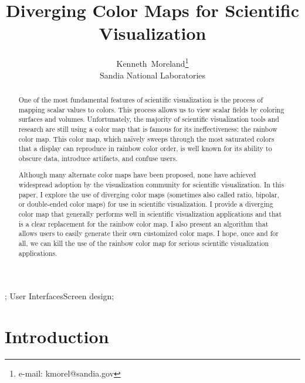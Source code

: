 \documentclass{acmsiggraph}               %
\title{Diverging Color Maps for Scientific Visualization}
\author{Kenneth~Moreland\thanks{e-mail: kmorel@sandia.gov}\\Sandia National Laboratories}
\begin{document}

\maketitle

\begin{abstract}
  One of the most fundamental features of scientific visualization is the
  process of mapping scalar values to colors.  This process allows us to
  view scalar fields by coloring surfaces and volumes.  Unfortunately, the
  majority of scientific visualization tools and research are still using a
  color map that is famous for its ineffectiveness: the rainbow color map.
  This color map, which na\"{i}vely sweeps through the most
  saturated colors that a display can reproduce in rainbow color order, is
  well known for its ability to obscure data, introduce artifacts, and
  confuse users.

  Although many alternate color maps have been proposed, none have achieved
  widespread adoption by the visualization community for scientific
  visualization.  In this paper, I explore the use of diverging color maps
  (sometimes also called ratio, bipolar, or double-ended color maps) for
  use in scientific visualization.  I provide a diverging color map that
  generally performs well in scientific visualization applications and that
  is a clear replacement for the rainbow color map.  I also present an
  algorithm that allows users to easily generate their own customized color
  maps.  I hope, once and for all, we can kill the use of the rainbow
  color map for serious scientific visualization applications.
\end{abstract}


\begin{CRcatlist}
  ;
    {User Interfaces}{Screen design};
\end{CRcatlist}

\keywordlist

\section{Introduction}
\label{sec:Introduction}
\end{document}

